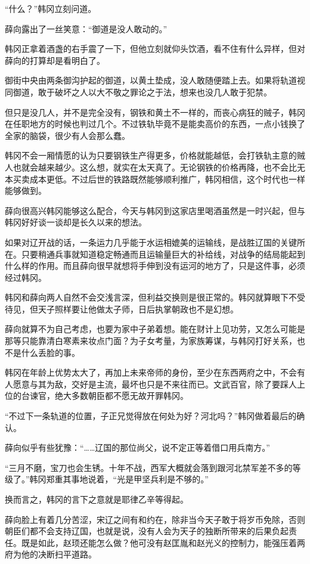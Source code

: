 “什么？”韩冈立刻问道。

薛向露出了一丝笑意：“御道是没人敢动的。”

韩冈正拿着酒盏的右手震了一下，但他立刻就仰头饮酒，看不住有什么异样，但对薛向的打算却是看明白了。

御街中央由两条御沟护起的御道，以黄土垫成，没人敢随便踏上去。如果将轨道视同御道，敢于破坏之人以大不敬之罪论之于法，想来也没几人敢于犯禁。

但只是没几人，并不是完全没有，钢铁和黄土不一样的，而丧心病狂的贼子，韩冈在任职地方的时候也判过几个。不过铁轨毕竟不是能卖高价的东西，一点小钱换了全家的脑袋，很少有人会那么蠢。

韩冈不会一厢情愿的认为只要钢铁生产得更多，价格就能越低，会打铁轨主意的贼人也就会越来越少。这么想，就实在太天真了。无论钢铁的价格再降，也不会比无本买卖成本更低。不过后世的铁路既然能够顺利推广，韩冈相信，这个时代也一样能够做到。

薛向很高兴韩冈能够这么配合，今天与韩冈到这家店里喝酒虽然是一时兴起，但与韩冈好好谈一谈却是长久以来的想法。

如果对辽开战的话，一条运力几乎能于水运相媲美的运输线，是战胜辽国的关键所在。只要稍通兵事就知道稳定畅通而且运输量巨大的补给线，对战争的结局能起到什么样的作用。而且薛向很早就想将手伸到没有运河的地方了，只是这件事，必须经过韩冈。

韩冈和薛向两人自然不会交浅言深，但利益交换则是很正常的。韩冈就算眼下不受待见，但天子照样要让他做太子师，日后执掌朝政也不是幻想。

薛向就算不为自己考虑，也要为家中子弟着想。能在财计上见功劳，又怎么可能是那等只能靠清白寒素来妆点门面？为子女考量，为家族筹谋，与韩冈打好关系，也不是什么丢脸的事。

韩冈在年龄上优势太大了，再加上未来帝师的身份，至少在东西两府之中，不会有人愿意与其为敌，交好是主流，最坏也只是不来往而已。文武百官，除了要踩人上位的台谏官，绝大多数朝臣都不愿无故开罪韩冈。

“不过下一条轨道的位置，子正兄觉得放在何处为好？河北吗？”韩冈做着最后的确认。

薛向似乎有些犹豫：“……辽国的那位尚父，说不定正等着借口用兵南方。”

“三月不磨，宝刀也会生锈。十年不战，西军大概就会落到跟河北禁军差不多的等级了。”韩冈郑重其事地说着，“光是甲坚兵利是不够的。”

换而言之，韩冈的言下之意就是耶律乙辛等得起。

薛向脸上有着几分苦涩，宋辽之间有和约在，除非当今天子敢于将岁币免除，否则朝臣们都不会支持辽国，也就是说，没有人会为天子的独断所带来的后果负起责任。既是如此，赵顼还能怎么做？他可没有赵匡胤和赵光义的控制力，能强压着两府为他的决断扫平道路。

